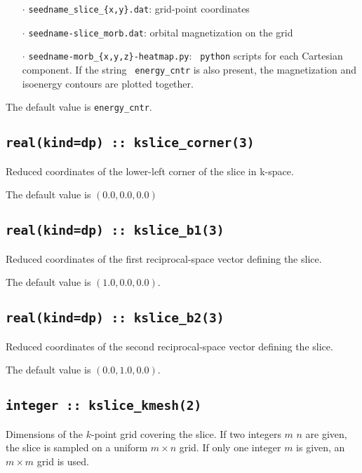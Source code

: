 \begin{itemize}
  \begin{itemize}

  \item[$\cdot$] {\tt seedname\_slice\_\{x,y\}.dat}: grid-point
    coordinates
    
  \item[$\cdot$] {\tt seedname-slice\_morb.dat}: orbital magnetization
    on the grid
    
  \item[$\cdot$] {\tt seedname-morb\_\{x,y,z\}-heatmap.py}: {\tt
      python} scripts for each Cartesian component. If the string {\tt
      energy\_cntr} is also present, the magnetization and isoenergy
    contours are plotted together.
    
  \end{itemize}

\end{itemize}

The default value is {\tt energy\_cntr}.

\subsection[kslice\_corner]{\tt real(kind=dp) :: kslice\_corner(3)}
Reduced coordinates of the lower-left corner of the slice in k-space.

The default value is $(0.0,0.0,0.0)$

\subsection[kslice\_corner]{\tt real(kind=dp) :: kslice\_b1(3)}
Reduced coordinates of the first reciprocal-space vector 
defining the slice.

The default value is $(1.0,0.0,0.0)$.

\subsection[kslice\_corner]{\tt real(kind=dp) :: kslice\_b2(3)}
Reduced coordinates of the second reciprocal-space vector 
defining the slice.

The default value is $(0.0,1.0,0.0)$.

\subsection[kslice\_num\_points]{\tt integer :: kslice\_kmesh(2)}

Dimensions of the $k$-point grid covering the slice.
If two integers $m$ $n$ are given, the slice is sampled on a uniform
$m\times n$ grid.  If only one integer $m$ is given, an $m\times m$
grid is used.

